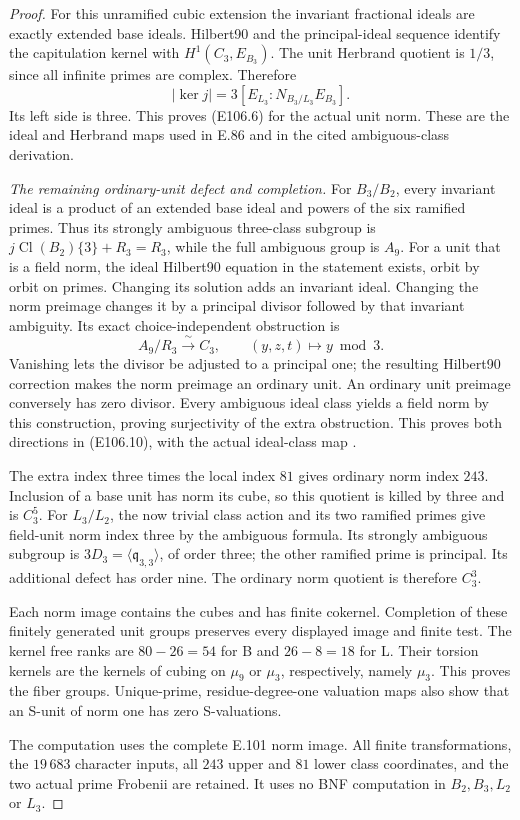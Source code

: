 \begin{proof}
For this unramified cubic extension the invariant
fractional ideals are exactly extended base ideals.
Hilbert90 and the principal-ideal sequence identify the
capitulation kernel with $H^1(C_3,E_{B_3})$.
The unit Herbrand quotient is $1/3$, since all infinite
primes are complex. Therefore
\[
                  |\ker j|=3[E_{L_3}:N_{B_3/L_3}E_{B_3}].
 \tag{E106.19}
\]
Its left side is three. This proves (E106.6) for the
actual unit norm. These are the ideal and Herbrand maps
used in E.86 and in the cited ambiguous-class derivation.

\emph{The remaining ordinary-unit defect and completion.}
For $B_3/B_2$, every invariant ideal is a product of an
extended base ideal and powers of the six ramified primes.
Thus its strongly ambiguous three-class subgroup is
$j\operatorname{Cl}(B_2)\{3\}+R_3=R_3$, while the full
ambiguous group is $A_9$. For a unit that is a field norm,
the ideal Hilbert90 equation in the statement exists,
orbit by orbit on primes. Changing its solution adds an
invariant ideal. Changing the norm preimage changes it
by a principal divisor followed by that invariant ambiguity.
Its exact choice-independent obstruction is
\[
                 A_9/R_3\xrightarrow{\ \sim\ }C_3,\qquad
                 (y,z,t)\longmapsto y\bmod3 .
 \tag{E106.20}
\]
Vanishing lets the divisor be adjusted to a principal one;
the resulting Hilbert90 correction makes the norm preimage
an ordinary unit. An ordinary unit preimage conversely has
zero divisor. Every ambiguous ideal class yields a field
norm by this construction, proving surjectivity of the
extra obstruction. This proves both directions in
(E106.10), with the actual ideal-class map
\cite[Proposition1]{E_LemmermeyerAmbiguous}.

The extra index three times the local index $81$ gives
ordinary norm index $243$. Inclusion of a base unit has
norm its cube, so this quotient is killed by three and is
$C_3^5$. For $L_3/L_2$, the now trivial class action and
its two ramified primes give field-unit norm index three
by the ambiguous formula. Its strongly ambiguous subgroup
is $3D_3=\langle\mathfrak q_{3,3}\rangle$, of order three;
the other ramified prime is principal. Its additional
defect has order nine. The ordinary norm quotient is
therefore $C_3^3$.

Each norm image contains the cubes and has finite cokernel.
Completion of these finitely generated unit groups preserves
every displayed image and finite test. The kernel free ranks
are $80-26=54$ for B and $26-8=18$ for L. Their torsion
kernels are the kernels of cubing on $\mu_9$ or $\mu_3$,
respectively, namely $\mu_3$. This proves the fiber groups.
Unique-prime, residue-degree-one valuation maps also show
that an S-unit of norm one has zero S-valuations.

The computation uses the complete E.101 norm image.
All finite transformations, the $19\,683$ character inputs,
all $243$ upper and $81$ lower class coordinates, and the
two actual prime Frobenii are retained. It uses no BNF
computation in $B_2,B_3,L_2$ or $L_3$.
\end{proof}

